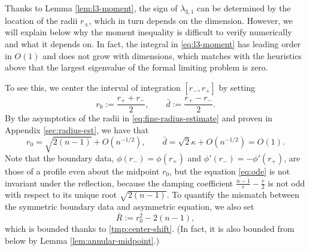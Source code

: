 \documentclass[11pt]{article}
\numberwithin{equation}{section}
\theoremstyle{definition}
\begin{document}
Thanks to Lemma \ref{lem:l3-moment}, the sign of $\lambda_{3,1}$ can be determined by the location of the radii $r_{\pm}$, which in turn depends on the dimension. However, we will explain below why the moment inequality is difficult to verify numerically and what it depends on. In fact, the integral in \eqref{eq:l3-moment} has leading order in $O(1)$ and does not grow with dimensions, which matches with the heuristics above that the largest eigenvalue of the formal limiting problem is
zero. 

To see this, we center the interval of integration $[r_-,r_+]$ by setting
\[ r_0:= \frac{r_+ + r_-}{2}, \qquad \bar{d}:= \frac{r_+ - r_-}{2}. \]
By the asymptotics of the radii in \eqref{eq:fine-radius-estimate} and proven in Appendix \ref{sec:radius-est}, we have that
\begin{equation}\label{tmp:center-shift}
    r_0 = \sqrt{2(n-1)} + O(n^{-1/2}), \qquad \bar{d} = \sqrt{2}\kappa + O(n^{-1/2}) = O(1). 
\end{equation}
Note that the boundary data, $\phi(r_-) = \phi(r_+)$ and $\phi'(r_-) = -\phi'(r_+)$, are those of a profile even about the midpoint $r_0$, but the equation \eqref{eq:ode} is not invariant under the reflection, because the damping coefficient $\frac{n-1}{r} - \frac{r}{2}$ is not odd with respect to its unique root $\sqrt{2(n-1)}$.
To quantify the mismatch between the symmetric boundary data and asymmetric equation, we also set
\[ \bar{R}:= r_0^2 - 2(n-1), \]
which is bounded thanks to \eqref{tmp:center-shift}. (In fact, it is also bounded from below by Lemma \ref{lem:annular-midpoint}.)
\end{document}
